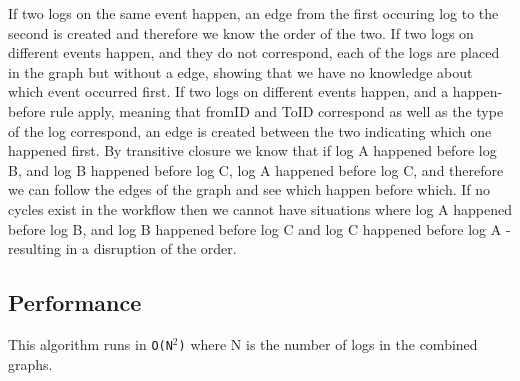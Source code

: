 \newpar If two logs on the same event happen, an edge from the first occuring log to the second is created and therefore we know the order of the two. 
If two logs on different events happen, and they do not correspond, each of the logs are placed in the graph but without a edge, showing that we have no knowledge about which event occurred first.
If two logs on different events happen, and a happen-before rule apply, meaning that fromID and ToID correspond as well as the type of the log correspond, an edge is created between the two indicating which one happened first. 
By transitive closure we know that if log A happened before log B, and log B happened before log C, log A happened before log C, and therefore we can follow the edges of the graph and see which happen before which.
If no cycles exist in the workflow then we cannot have situations where log A happened before log B, and log B happened before log C and log C happened before log A - resulting in a disruption of the order. %

\subsection{Performance} %
This algorithm runs in \texttt{O(N$^2$)} where N is the number of logs in the combined graphs.

